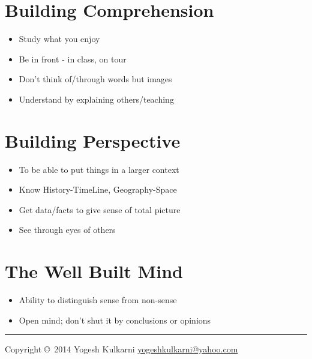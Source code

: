 \begin{multicols}{3}
\section{Building Comprehension}
\begin{itemize}[noitemsep,nolistsep]
\item Study what you enjoy
\item Be in front - in class, on tour
\item Don’t think of/through words but images
\item Understand by explaining others/teaching
\end{itemize}

\section{Building Perspective}
\begin{itemize}[noitemsep,nolistsep]
\item To be able to put things in a larger context
\item Know History-TimeLine, Geography-Space
\item Get data/facts to give sense of total picture
\item See through eyes of others
\end{itemize}

\section{The Well Built Mind}
\begin{itemize}[noitemsep,nolistsep]
\item Ability to distinguish sense from non-sense
\item Open mind; don’t shut it by conclusions or opinions
\end{itemize}



\rule{0.3\linewidth}{0.25pt}

\scriptsize

Copyright \copyright\ 2014 Yogesh Kulkarni
\href{http://www.yogeshkulkarni.com}{yogeshkulkarni@yahoo.com}

\end{multicols}

